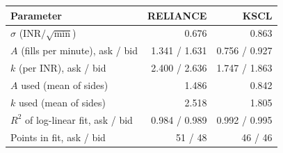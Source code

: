 \begin{tabular}{lrr}
\toprule
Parameter & RELIANCE & KSCL \\
\midrule
$\sigma$ (INR$/\sqrt{\text{min}}$) & 0.676 & 0.863 \\
$A$ (fills per minute), ask / bid & 1.341 / 1.631 & 0.756 / 0.927 \\
$k$ (per INR), ask / bid & 2.400 / 2.636 & 1.747 / 1.863 \\
$A$ used (mean of sides) & 1.486 & 0.842 \\
$k$ used (mean of sides) & 2.518 & 1.805 \\
$R^2$ of log-linear fit, ask / bid & 0.984 / 0.989 & 0.992 / 0.995 \\
Points in fit, ask / bid & 51 / 48 & 46 / 46 \\
\bottomrule
\end{tabular}
